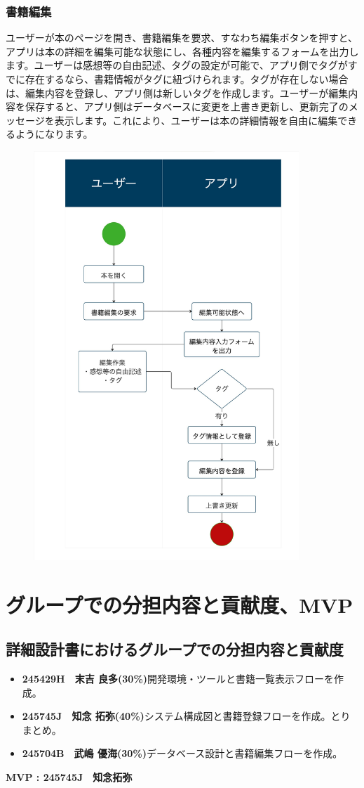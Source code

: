 \documentclass[a4paper, 11pt, titlepage]{jsarticle}
\begin{document}
\subsubsection{書籍編集}
ユーザーが本のページを開き、書籍編集を要求、すなわち編集ボタンを押すと、アプリは本の詳細を編集可能な状態にし、各種内容を編集するフォームを出力します。ユーザーは感想等の自由記述、タグの設定が可能で、アプリ側でタグがすでに存在するなら、書籍情報がタグに紐づけられます。タグが存在しない場合は、編集内容を登録し、アプリ側は新しいタグを作成します。ユーザーが編集内容を保存すると、アプリ側はデータベースに変更を上書き更新し、更新完了のメッセージを表示します。これにより、ユーザーは本の詳細情報を自由に編集できるようになります。
\begin{figure}[h]
\centering
\includegraphics[width=100mm]{flow-henshu.jpg}
\label{fig:func}
\end{figure}

\section{グループでの分担内容と貢献度、MVP}%

\subsection{詳細設計書におけるグループでの分担内容と貢献度}
\begin{itemize}
    \item \textbf{245429H　末吉 良多(30\%)}開発環境・ツールと書籍一覧表示フローを作成。
    \item \textbf{245745J　知念 拓弥(40\%)}システム構成図と書籍登録フローを作成。とりまとめ。
    \item \textbf{245704B　武嶋 優海(30\%)}データベース設計と書籍編集フローを作成。
\end{itemize}

\textbf{MVP : 245745J　知念拓弥}
\end{document}
